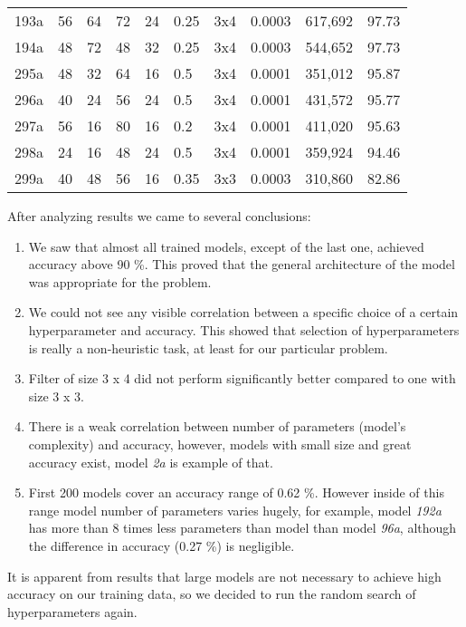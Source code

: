\begin{table}[ht]
\begin{tabular}{llllllllrl}
      193a & 56 & 64 & 72 & 24 & 0.25 & 3x4 & 0.0003 &   617,692 & 97.73\\
      194a & 48 & 72 & 48 & 32 & 0.25 & 3x4 & 0.0003 &   544,652 & 97.73\\\midrule
      295a & 48 & 32 & 64 & 16 & 0.5  & 3x4 & 0.0001 &   351,012 & 95.87\\
      296a & 40 & 24 & 56 & 24 & 0.5  & 3x4 & 0.0001 &   431,572 & 95.77\\
      297a & 56 & 16 & 80 & 16 & 0.2  & 3x4 & 0.0001 &   411,020 & 95.63\\
      298a & 24 & 16 & 48 & 24 & 0.5  & 3x4 & 0.0001 &   359,924 & 94.46\\
      299a & 40 & 48 & 56 & 16 & 0.35 & 3x3 & 0.0003 &   310,860 & 82.86\\\bottomrule
    \end{tabular}
    \label{hyper_results1}
\end{table}

After analyzing results we came to several conclusions:

\begin{enumerate}
    \item We saw that almost all trained models, except of the last one, achieved accuracy above 90 \%. This proved that the general architecture of the model was appropriate for the problem.
    \item We could not see any visible correlation between a specific choice of a certain hyperparameter and accuracy. This showed that selection of hyperparameters is really a non-heuristic task, at least for our particular problem.
    \item Filter of size 3 x 4 did not perform significantly better compared to one with size 3 x 3. 
    \item There is a weak correlation between number of parameters (model's complexity) and accuracy, however, models with small size and great accuracy exist, model \textit{2a} is example of that.
    \item First 200 models cover an accuracy range of 0.62 \%. However inside of this range model number of parameters varies hugely, for example, model \textit{192a} has more than 8 times less parameters than model than model \textit{96a}, although the difference in accuracy (0.27 \%) is negligible.
\end{enumerate}

It is apparent from results that large models are not necessary to achieve high accuracy on our training data, so we decided to run the random search of hyperparameters again.

